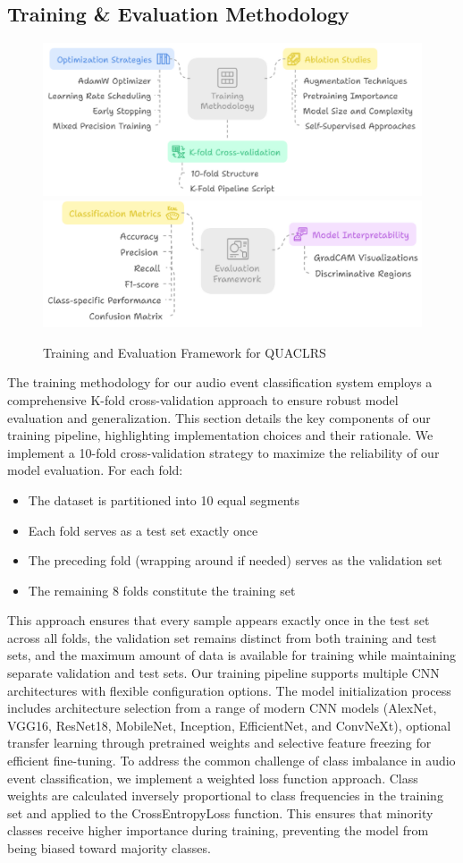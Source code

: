 \documentclass[11pt]{article}
\begin{document}
\subsection{Training  \& Evaluation Methodology}
\begin{figure}[t]
  \includegraphics[width=0.48\linewidth]{latex/assets/training_framework.PNG} \hfill
  \includegraphics[width=0.48\linewidth]{latex/assets/evaluation_framework.PNG}
  \caption {Training and Evaluation Framework for QUACLRS}
\end{figure}
The training methodology for our audio event classification system employs a comprehensive K-fold cross-validation approach to ensure robust model evaluation and generalization. This section details the key components of our training pipeline, highlighting implementation choices and their rationale. We implement a 10-fold cross-validation strategy to maximize the reliability of our model evaluation. For each fold:
\begin{itemize}
    \item The dataset is partitioned into 10 equal segments
    \item Each fold serves as a test set exactly once
    \item The preceding fold (wrapping around if needed) serves as the validation set
    \item The remaining 8 folds constitute the training set
\end{itemize}
This approach ensures that every sample appears exactly once in the test set across all folds, the validation set remains distinct from both training and test sets, and the maximum amount of data is available for training while maintaining separate validation and test sets.
Our training pipeline supports multiple CNN architectures with flexible configuration options. The model initialization process includes architecture selection from a range of modern CNN models (AlexNet, VGG16, ResNet18, MobileNet, Inception, EfficientNet, and ConvNeXt), optional transfer learning through pretrained weights and selective feature freezing for efficient fine-tuning. To address the common challenge of class imbalance in audio event classification, we implement a weighted loss function approach. Class weights are calculated inversely proportional to class frequencies in the training set and applied to the CrossEntropyLoss function. This ensures that minority classes receive higher importance during training, preventing the model from being biased toward majority classes. 
\end{document}
